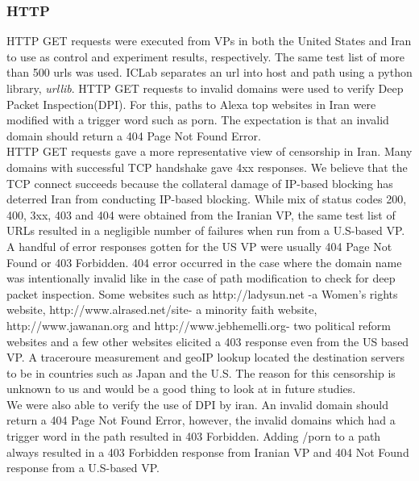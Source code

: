 \subsubsection{HTTP}
 HTTP GET requests were executed from VPs  in both the United States and Iran to use as control and experiment results, respectively. The same test list of more than 500 urls was used. ICLab separates an url into host and path using a python library, \textit{urllib}. HTTP GET requests to invalid domains were used to verify Deep Packet Inspection(DPI). For this, paths to Alexa top websites in Iran were modified with a trigger word such as porn. The expectation is that an invalid domain should return a 404 Page Not Found Error.\\
HTTP GET requests gave a more representative view of censorship in Iran. Many domains with successful TCP handshake gave 4xx responses. We believe that  the TCP connect succeeds because the collateral damage of IP-based blocking has deterred Iran from conducting IP-based blocking. While mix of status codes 200, 400, 3xx, 403 and 404 were obtained from the Iranian VP, the same test list of URLs resulted in a negligible number of failures when run from a U.S-based VP.  A handful of error responses gotten for the US VP were usually  404 Page Not Found or 403 Forbidden. 404 error occurred in the case where the domain name was intentionally invalid like in the case of path modification to check for deep packet inspection. Some websites such as http://ladysun.net -a Women's rights website, http://www.alrased.net/site- a minority faith website, http://www.jawanan.org and http://www.jebhemelli.org- two political reform websites and a few other websites elicited a 403 response even from the US based VP. A traceroure measurement and geoIP lookup located the destination servers to be in countries such as  Japan and the U.S.  The reason for this censorship is unknown to us and would be a good thing to look at in future studies.\\
We were also able to verify the use of DPI by iran. An invalid domain should return a 404 Page Not Found Error, however, the invalid domains which had a trigger word in the path resulted in 403 Forbidden. Adding /porn to a path always resulted in a 403 Forbidden response from Iranian VP and 404 Not Found response from a U.S-based VP. \\ 



